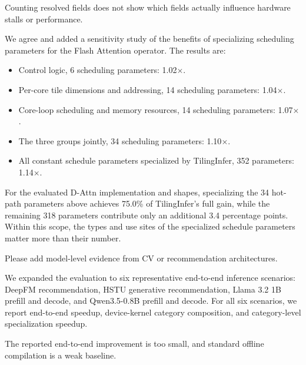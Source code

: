 {Counting resolved fields does not show which fields actually influence
hardware stalls or performance.}

\authorresponse
We agree and added a sensitivity study of the benefits of specializing
scheduling parameters for the Flash Attention operator.  The results are:

\begin{itemize}[leftmargin=*,nosep]
  \item Control logic, 6 scheduling parameters: 1.02$\times$.
  \item Per-core tile dimensions and addressing, 14 scheduling parameters:
  1.04$\times$.
  \item Core-loop scheduling and memory resources, 14 scheduling parameters:
  1.07$\times$.
  \item The three groups jointly, 34 scheduling parameters: 1.10$\times$.
  \item All constant schedule parameters specialized by TilingInfer, 352
  parameters: 1.14$\times$.
\end{itemize}

For the evaluated D-Attn implementation and shapes, specializing the 34
hot-path parameters above achieves 75.0\% of TilingInfer's full gain, while the
remaining 318 parameters contribute only an additional 3.4 percentage points.
Within this scope, the types and use sites of the specialized schedule
parameters matter more than their number.


{Please add model-level evidence from CV or recommendation architectures.}

\authorresponse
We expanded the evaluation to six representative end-to-end inference
scenarios: DeepFM recommendation, HSTU generative recommendation, Llama 3.2 1B
prefill and decode, and Qwen3.5-0.8B prefill and decode.  For all six scenarios,
we report end-to-end speedup, device-kernel category composition, and
category-level specialization speedup.


{The reported end-to-end improvement is too small, and standard offline
compilation is a weak baseline.}

